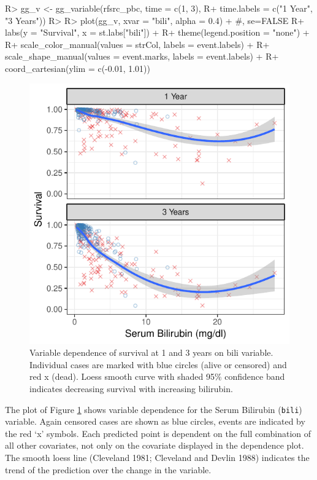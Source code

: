 \documentclass[article]{jss}
\begin{document}
\begin{Schunk}
\begin{Sinput}
R> gg_v <- gg_variable(rfsrc_pbc, time = c(1, 3),
R+                     time.labels = c("1 Year", "3 Years"))
R> 
R> plot(gg_v, xvar = "bili", alpha = 0.4) + #, se=FALSE
R+   labs(y = "Survival", x = st.labs["bili"]) +
R+   theme(legend.position = "none") +
R+   scale_color_manual(values = strCol, labels = event.labels) +
R+   scale_shape_manual(values = event.marks, labels = event.labels) +
R+   coord_cartesian(ylim = c(-0.01, 1.01))
\end{Sinput}
\begin{figure}[!htb]

{\centering \includegraphics{fig-rfs/rfs-variable-plotbili-1} 

}

\caption[Variable dependence of survival at 1 and 3 years on bili variable]{Variable dependence of survival at 1 and 3 years on bili variable. Individual cases are marked with blue circles (alive or censored) and red x (dead). Loess smooth curve with shaded 95\% confidence band indicates decreasing survival with increasing bilirubin.}\label{fig:variable-plotbili}
\end{figure}
\end{Schunk}

The  plot of Figure \ref{fig:variable-plotbili} shows
variable dependence for the Serum Bilirubin (\texttt{bili}) variable.
Again censored cases are shown as blue circles, events are indicated by
the red `x' symbols. Each predicted point is dependent on the full
combination of all other covariates, not only on the covariate displayed
in the dependence plot. The smooth loess line (Cleveland 1981; Cleveland
and Devlin 1988) indicates the trend of the prediction over the change
in the variable.
\end{document}
